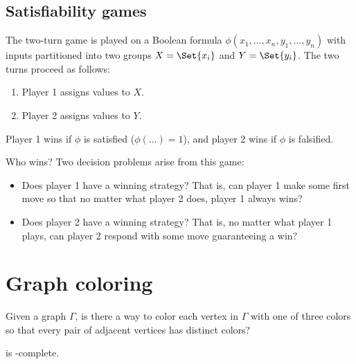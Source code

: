 
\subsection{Satisfiability games}

\begin{definition}%
  The two-turn \SAT{} game is played on a Boolean formula \(\phi(x_1, \dots,
  x_n, y_1, \dots, y_n)\) with inputs partitioned into two groups \(X =
  \Set{x_i}\) and \(Y = \Set{y_i}\).  The two turns proceed as follows:
  \begin{enumerate}
    \item Player 1 assigns values to \(X\).
    \item Player 2 assigns values to \(Y\).
  \end{enumerate}
  Player 1 wins if \(\phi\) is satisfied (\(\phi(\dots) = 1\)), and player 2
  wins if \(\phi\) is falsified.

  Who wins?  Two decision problems arise from this game:
  \begin{itemize}
    \item Does player 1 have a winning strategy?  That is, can player 1 make
      some first move so that no matter what player 2 does, player 1 always
      wins?

    \item Does player 2 have a winning strategy?  That is, no matter what
      player 1 plays, can player 2 respond with some move guaranteeing a win?
  \end{itemize}

\end{definition}


\section{Graph coloring}

\begin{definition}%
  Given a graph \(\Gamma\), is there a way to color each vertex in  \(\Gamma\)
  with one of three colors so that every pair of adjacent vertices has distinct
  colors?
\end{definition}

\begin{theorem}
   is \NP-complete.
\end{theorem}

